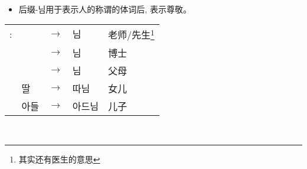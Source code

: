\begin{grammar}
\begin{grammarsect}[\kr -(으){}시-]
\begin{tabular}{lllll}
        \end{tabular}\\
        \begin{itemize}
            \item 后缀{\kr -님}用于表示人的称谓的体词后, 表示尊敬。
        \end{itemize}
        \begin{tabular}{lllll}
            \kr \ruby{例}{예}:&\kr \ruby{先生}{선생}&$\to$&\kr  \ruby{先生}{선생}님 &老师/先生\footnote{其实还有医生的意思}\\
            &\kr \ruby{博士}{박사} &$\to$&\kr  \ruby{博士}{박사}님 &博士 \\
            &\kr \ruby{父母}{부모} &$\to$&\kr  \ruby{父母}{부모}님 &父母 \\
            &\kr 딸&$\to$&\kr  따님 &女儿 \\
            &\kr 아들 &$\to$&\kr  아드님 &儿子
        \end{tabular}\\
    \end{grammarsect}
\end{grammar}
